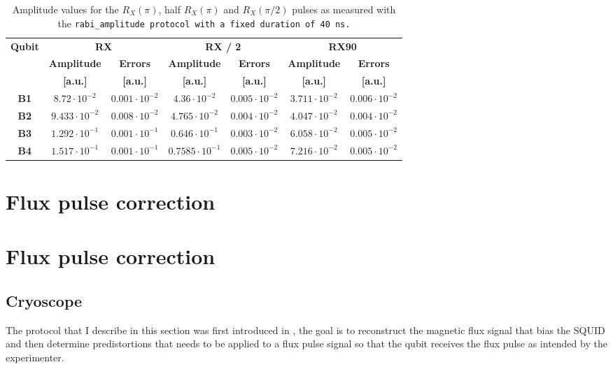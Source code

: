 \begin{table}[h!]
    \centering
    \begin{tabular}{c|cc|cc|cc}
        \toprule
        \textbf{Qubit} & \multicolumn{2}{c|}{\textbf{RX}} & \multicolumn{2}{c|}{\textbf{RX / 2}} & \multicolumn{2}{c|}{\textbf{RX90}} \\
         & \textbf{Amplitude} & \textbf{Errors} & \textbf{Amplitude} & \textbf{Errors} & \textbf{Amplitude} & \textbf{Errors} \\
         & \textbf{[a.u.]}  & \textbf{[a.u.]}  & \textbf{[a.u.]}  & \textbf{[a.u.]} & \textbf{[a.u.]} & \textbf{[a.u.]}\\
        \midrule
        \textbf{B1} & $8.72 \cdot 10^{-2}$ & $0.001 \cdot 10^{-2}$ & $4.36 \cdot 10^{-2}$ & $0.005 \cdot 10^{-2}$ & $3.711 \cdot 10^{-2}$ & $0.006 \cdot 10^{-2}$ \\
        \textbf{B2} & $9.433 \cdot 10^{-2}$ & $0.008 \cdot 10^{-2}$ & $4.765 \cdot 10^{-2}$ & $0.004 \cdot 10^{-2}$ & $4.047 \cdot 10^{-2}$ & $0.004 \cdot 10^{-2}$ \\
        \textbf{B3} & $1.292 \cdot 10^{-1}$ & $0.001 \cdot 10^{-1}$ & $0.646 \cdot 10^{-1}$ & $0.003 \cdot 10^{-2}$ & $6.058 \cdot 10^{-2}$ & $0.005 \cdot 10^{-2}$ \\
        \textbf{B4} & $1.517 \cdot 10^{-1}$ & $0.001 \cdot 10^{-1}$ & $0.7585 \cdot 10^{-1}$ & $0.005 \cdot 10^{-2}$ & $7.216 \cdot 10^{-2}$ & $0.005 \cdot 10^{-2}$ \\
        \bottomrule
    \end{tabular}
    \caption{Amplitude values for the $R_X(\pi)$, half $R_X(\pi)$ and $R_X(\pi/2)$ pulses as measured with the \tt{rabi\_amplitude} protocol with a fixed duration of 40 ns.}
\end{table}


\section{Flux pulse correction}

\section{Flux pulse correction}

\subsection{Cryoscope}
The protocol that I describe in this section was first introduced in \cite{rol_time-domain_2020}, the goal is to reconstruct the magnetic flux signal that bias the SQUID and then determine predistortions that needs to be applied to a flux pulse signal so that the qubit receives the flux pulse as intended by the experimenter.

